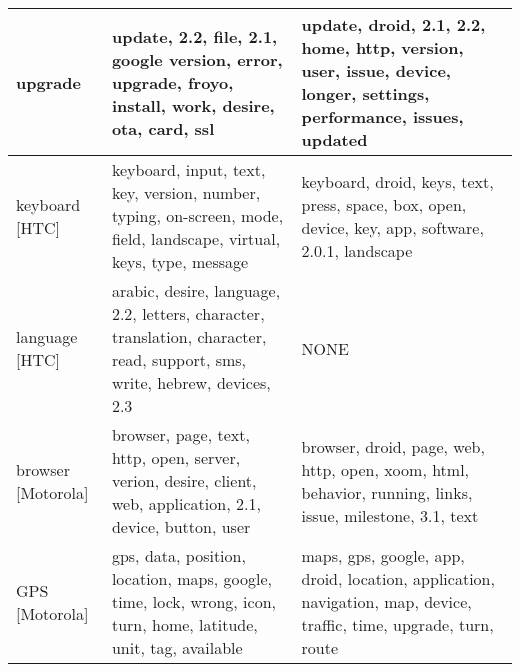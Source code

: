 \begin{table*}[!htb]
\begin{tabular}{|m{1.75cm}<{\centering}||m{7.33cm}<{\centering}||m{7.33cm}<{\centering}|}
upgrade
&
update,  2.2,  file,  2.1,  google 
  version,  error,  upgrade,  froyo,  install,  
  work,  desire,  ota,  card,  ssl 
&
update,  droid,  2.1, 2.2,  home, 
http,  version,  user,  issue,  device, 
longer,  settings,  performance,  issues,  updated
\\ \hline

\hline
keyboard
[HTC]
&
keyboard,  input, text,  key,  version,  
number,  typing,  on-screen,  mode,  field,  
  landscape,  virtual,  keys,  type,  message 
&
keyboard,  droid,  keys, text,  press, 
space,  box,  open,  device,  key, 
app,  software,  2.0.1,  landscape
\\ \hline

language 
[HTC]
&
arabic,  desire,  language,  2.2,  letters,  
character,  translation,  character,  read,  support,  
sms,  write,  hebrew,  devices, 2.3 
&
NONE
\\ \hline

\hline
browser
[Motorola]
&
browser,  page,  text,  http,  open,  
server, verion,  desire,  client,  web,  
application, 2.1,  device,  button,  user 
&
browser,  droid,  page,  web,  http,  open, 
xoom,  html,  behavior,  running,  links, 
issue,  milestone,  3.1,  text
\\ \hline
GPS 
[Motorola]
& 
gps,  data, position,  location,  maps,  
google,  time, lock,  wrong,  icon,  turn,  
home,  latitude,  unit,  tag,  available 
&
maps,  gps,  google,  app,  droid, 
location,  application,  navigation,  map, device, 
traffic,  time,  upgrade,  turn,  route
\\ \hline

\end{tabular}
\end{table*}

